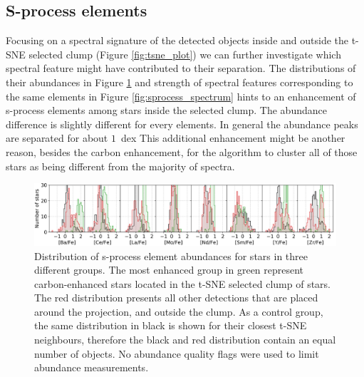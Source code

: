 \subsection{S-process elements}
\label{sec:sprocess}
Focusing on a spectral signature of the detected objects inside and outside the t-SNE selected clump (Figure \ref{fig:tsne_plot}) we can further investigate which spectral feature might have contributed to their separation. The distributions of their abundances in Figure \ref{fig:sprocess_hist} and strength of spectral features corresponding to the same elements in Figure \ref{fig:sprocess_spectrum} hints to an enhancement of s-process elements among stars inside the selected clump. The abundance difference is slightly  different for every elements. In general the abundance peaks are separated for about $1$~dex This additional enhancement might be another reason, besides the carbon enhancement, for the algorithm to cluster all of those stars as being different from the majority of spectra.

\begin{figure}
	\centering
	\includegraphics[width=\textwidth]{sprocess_hist.png}
	\caption{Distribution of s-process element abundances for stars in three different groups. The most enhanced group in green represent carbon-enhanced stars located in the t-SNE selected clump of stars. The red distribution presents all other detections that are placed around the projection, and outside the clump. As a control group, the same distribution in black is shown for their closest t-SNE neighbours, therefore the black and red distribution contain an equal number of objects. No abundance quality flags were used to limit abundance measurements.}
	\label{fig:sprocess_hist}
\end{figure}

